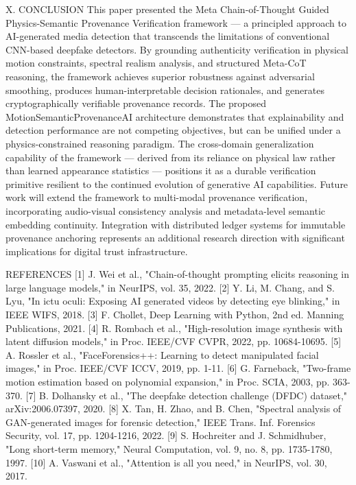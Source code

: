 X.  CONCLUSION
This paper presented the Meta Chain-of-Thought Guided Physics-Semantic Provenance Verification framework — a principled approach to AI-generated media detection that transcends the limitations of conventional CNN-based deepfake detectors. By grounding authenticity verification in physical motion constraints, spectral realism analysis, and structured Meta-CoT reasoning, the framework achieves superior robustness against adversarial smoothing, produces human-interpretable decision rationales, and generates cryptographically verifiable provenance records.
The proposed MotionSemanticProvenanceAI architecture demonstrates that explainability and detection performance are not competing objectives, but can be unified under a physics-constrained reasoning paradigm. The cross-domain generalization capability of the framework — derived from its reliance on physical law rather than learned appearance statistics — positions it as a durable verification primitive resilient to the continued evolution of generative AI capabilities.
Future work will extend the framework to multi-modal provenance verification, incorporating audio-visual consistency analysis and metadata-level semantic embedding continuity. Integration with distributed ledger systems for immutable provenance anchoring represents an additional research direction with significant implications for digital trust infrastructure.

REFERENCES
[1] J. Wei et al., "Chain-of-thought prompting elicits reasoning in large language models," in NeurIPS, vol. 35, 2022.
[2] Y. Li, M. Chang, and S. Lyu, "In ictu oculi: Exposing AI generated videos by detecting eye blinking," in IEEE WIFS, 2018.
[3] F. Chollet, Deep Learning with Python, 2nd ed. Manning Publications, 2021.
[4] R. Rombach et al., "High-resolution image synthesis with latent diffusion models," in Proc. IEEE/CVF CVPR, 2022, pp. 10684-10695.
[5] A. Rossler et al., "FaceForensics++: Learning to detect manipulated facial images," in Proc. IEEE/CVF ICCV, 2019, pp. 1-11.
[6] G. Farneback, "Two-frame motion estimation based on polynomial expansion," in Proc. SCIA, 2003, pp. 363-370.
[7] B. Dolhansky et al., "The deepfake detection challenge (DFDC) dataset," arXiv:2006.07397, 2020.
[8] X. Tan, H. Zhao, and B. Chen, "Spectral analysis of GAN-generated images for forensic detection," IEEE Trans. Inf. Forensics Security, vol. 17, pp. 1204-1216, 2022.
[9] S. Hochreiter and J. Schmidhuber, "Long short-term memory," Neural Computation, vol. 9, no. 8, pp. 1735-1780, 1997.
[10] A. Vaswani et al., "Attention is all you need," in NeurIPS, vol. 30, 2017.
